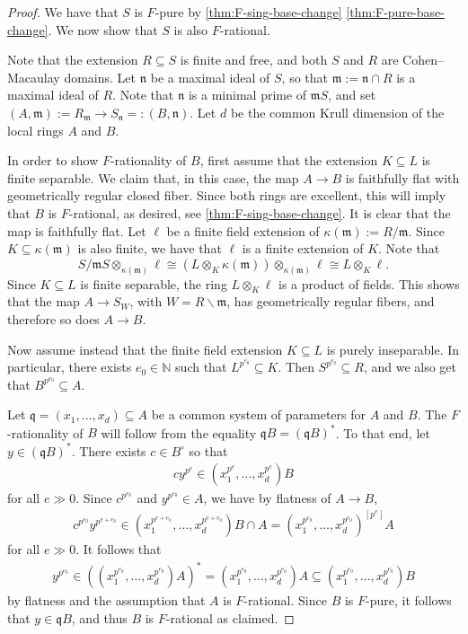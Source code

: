 \documentclass[10pt,a4paper]{amsart}
\newcommand{\NN}{\mathbb{N}}
\newcommand{\fm}{\mathfrak{m}}
\newcommand{\fn}{\mathfrak{n}}
\newcommand{\fq}{\mathfrak{q}}
\begin{document}
\begin{proof}
We have that $S$ is $F$-pure by \cref{thm:F-sing-base-change} \ref{thm:F-pure-base-change}. We now show that $S$ is also $F$-rational.

    Note that the extension $R \subseteq S$ is finite and free, and both $S$ and $R$ are Cohen--Macaulay domains. Let $\fn$ be a maximal ideal of $S$, so that $\fm:=\fn \cap R$ is a maximal ideal of $R$. Note that $\fn$ is a minimal prime of $\fm S$, and set $(A,\fm):=R_\fm \to S_\fn=:(B,\fn)$. Let $d$ be the common Krull dimension of the local rings $A$ and $B$.
    
    In order to show $F$-rationality of $B$, first assume that the extension $K \subseteq L$ is finite separable. We claim that, in this case, the map $A \to B$ is faithfully flat with geometrically regular closed fiber. Since both rings are excellent, this will imply that $B$ is $F$-rational, as desired, see \cref{thm:F-sing-base-change}. It is clear that the map is faithfully flat.
    Let $\ell$ be a finite field extension of $\kappa(\fm):=R/\fm$. Since $K \subseteq \kappa(\fm)$ is also finite, we have that $\ell$ is a finite extension of $K$. Note that
    \[
    S/\fm S \otimes_{\kappa(\fm)} \ell \cong (L \otimes_K \kappa(\fm)) \otimes_{\kappa(\fm)} \ell \cong L \otimes_K \ell.
    \]
    Since $K \subseteq L$ is finite separable, the ring $L \otimes_K \ell$ is a product of fields. This shows that the map $A \to S_W$, with $W=R \smallsetminus \fm$, has geometrically regular fibers, and therefore so does $A \to B$.

    Now assume instead that the finite field extension $K \subseteq L$ is purely inseparable. In particular, there exists $e_{0}\in\NN$ such that $L^{p^{e_0}} \subseteq K$. Then $S^{p^{e_0}} \subseteq R$, and 
    we also get that $B^{p^{e_0}} \subseteq A$.
    
    Let $\fq = (x_1,\dots, x_d)\subseteq A$ be a common system of parameters for $A$ and $B$. The $F$-rationality of $B$ will follow from the equality $\fq B =(\fq B)^*$. To that end, let $y\in (\fq B)^*$. There exists $c\in B^{\circ}$ so that
    \begin{align*}
        cy^{p^e} \in (x_1^{p^e},\dots, x_d^{p^e})B
    \end{align*}
    for all $e\gg 0$. Since $c^{p^{e_0}}$ and $y^{p^{e_0}}\in A$, we have by flatness of $A\to B$,
    \begin{align*}
        c^{p^{e_0}} y^{p^{e+e_0}}\in (x_1^{p^{e+e_0}},\dots, x_d^{p^{e+e_0}})B \cap A = (x_1^{p^{e_0}},\ldots,x_d^{p^{e_0}})^{[p^e]}A
    \end{align*}
    for all $e\gg 0$. It follows that
    \begin{align*}
        y^{p^{e_0}}\in \left((x_1^{p^{e_0}},\dots, x_d^{p^{e_0}})A\right)^* = (x_1^{p^{e_0}},\dots, x_d^{p^{e_0}})A\subseteq (x_1^{p^{e_0}},\dots, x_d^{p^{e_0}})B
    \end{align*}
    by flatness and the assumption that $A$ is $F$-rational. Since $B$ is $F$-pure, it follows that $y\in \fq B$, and thus $B$ is $F$-rational as claimed. 
    

\end{proof}
\end{document}
